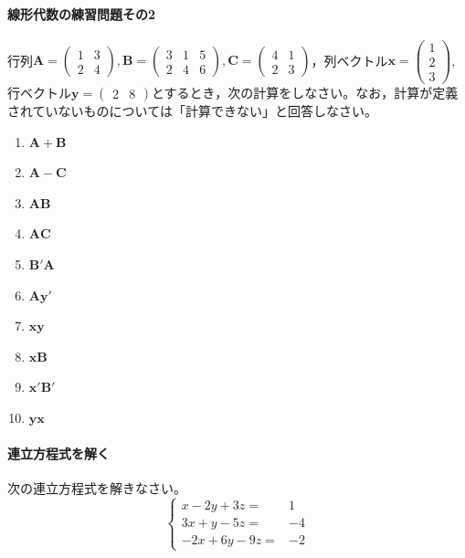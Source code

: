 \documentclass{ltjsbook}
\begin{document}
\paragraph{線形代数の練習問題その2}行列$\bm{A}=\begin{pmatrix}1 & 3 \\2 & 4\end{pmatrix},\bm{B}=\begin{pmatrix}3&1&5\\2&4&6\end{pmatrix},\bm{C}=\begin{pmatrix}4&1\\2&3\end{pmatrix}$，列ベクトル$\bm{x}=\begin{pmatrix}1\\2\\3\end{pmatrix}$,行ベクトル$\bm{y}=\begin{pmatrix}2&8\end{pmatrix}$とするとき，次の計算をしなさい。なお，計算が定義されていないものについては「計算できない」と回答しなさい。
\begin{enumerate}
    \item $\bm{A}+\bm{B}$
    \item $\bm{A}-\bm{C}$
    \item $\bm{AB}$
    \item $\bm{AC}$
    \item $\bm{B}'\bm{A}$
    \item $\bm{A}\bm{y}'$
    \item $\bm{xy}$
    \item $\bm{xB}$
    \item $\bm{x}'\bm{B}'$
    \item $\bm{yx}$
\end{enumerate}

\paragraph{連立方程式を解く}次の連立方程式を解きなさい。
\[
    \left\{\begin{array}{rr}x-2 y+3 z= & 1 \\ 3 x+y-5 z= & -4 \\ -2 x+6 y-9 z= & -2\end{array}\right.
\]
\end{document}
